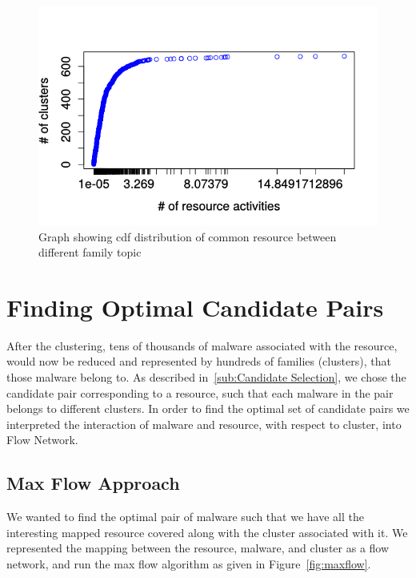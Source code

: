 \begin{figure}[htbp]
\begin{center}
  \includegraphics[scale=0.7]{figures/inter_clustered_common.png}
\end{center}
\captionsetup{font=small}
\caption{Graph showing cdf distribution of common resource between different family topic}
\label{fig:interclustcommon}
\end{figure}

\section{Finding Optimal Candidate Pairs}
\label{sec:Finding Optimal Candidate Pairs}
After the clustering, tens of thousands of malware associated with the resource, would now be reduced and represented by hundreds of families (clusters), that those malware belong to.
As described in~\autoref{sub:Candidate Selection}, we chose the candidate pair corresponding to a resource, such that each malware in the pair belongs to different clusters.
In order to find the optimal set of candidate pairs we interpreted the interaction of malware and resource, with respect to cluster, into Flow Network.
\subsection{Max Flow Approach}
\label{sub:Max Flow Approach}
We wanted to find the optimal pair of malware such that we have all the interesting mapped resource covered along with the cluster associated with it.
We represented the mapping between the resource, malware, and cluster as a flow network, and run the max flow algorithm as given in Figure~\ref{fig:maxflow}.\\

